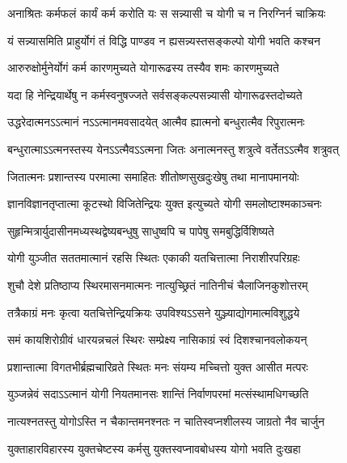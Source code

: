\twolineshloka
{अनाश्रितः कर्मफलं कार्यं कर्म करोति यः}
{स सन्न्यासी च योगी च न निरग्निर्न चाक्रियः}%

\twolineshloka
{यं सन्न्यासमिति प्राहुर्योगं तं विद्धि पाण्डव}
{न ह्यसन्न्यस्तसङ्कल्पो योगी भवति कश्चन}%

\twolineshloka
{आरुरुक्षोर्मुनेर्योगं कर्म कारणमुच्यते}
{योगारूढस्य तस्यैव शमः कारणमुच्यते}%

\twolineshloka
{यदा हि नेन्द्रियार्थेषु न कर्मस्वनुषज्जते}
{सर्वसङ्कल्पसन्न्यासी योगारूढस्तदोच्यते}%

\twolineshloka
{उद्धरेदात्मनऽऽत्मानं नऽऽत्मानमवसादयेत्}
{आत्मैव ह्यात्मनो बन्धुरात्मैव रिपुरात्मनः}%

\twolineshloka
{बन्धुरात्माऽऽत्मनस्तस्य येनऽऽत्मैवऽऽत्मना जितः}
{अनात्मनस्तु शत्रुत्वे वर्तेतऽऽत्मैव शत्रुवत्}%

\twolineshloka
{जितात्मनः प्रशान्तस्य परमात्मा समाहितः}
{शीतोष्णसुखदुःखेषु तथा मानापमानयोः}%

\twolineshloka
{ज्ञानविज्ञानतृप्तात्मा कूटस्थो विजितेन्द्रियः}
{युक्त इत्युच्यते योगी समलोष्टाश्मकाञ्चनः}%

\twolineshloka
{सुहृन्मित्रार्युदासीनमध्यस्थद्वेष्यबन्धुषु}
{साधुष्वपि च पापेषु समबुद्धिर्विशिष्यते}%

\twolineshloka
{योगी युञ्जीत सततमात्मानं रहसि स्थितः}
{एकाकी यतचित्तात्मा निराशीरपरिग्रहः}%

\twolineshloka
{शुचौ देशे प्रतिष्ठाप्य स्थिरमासनमात्मनः}
{नात्युच्छ्रितं नातिनीचं चैलाजिनकुशोत्तरम्}%

\twolineshloka
{तत्रैकाग्रं मनः कृत्वा यतचित्तेन्द्रियक्रियः}
{उपविश्यऽऽसने युञ्ज्याद्योगमात्मविशुद्धये}%

\twolineshloka
{समं कायशिरोग्रीवं धारयन्नचलं स्थिरः}
{सम्प्रेक्ष्य नासिकाग्रं स्वं दिशश्चानवलोकयन्}%

\twolineshloka
{प्रशान्तात्मा विगतभीर्ब्रह्मचारिव्रते स्थितः}
{मनः संयम्य मच्चित्तो युक्त आसीत मत्परः}%

\twolineshloka
{युञ्जन्नेवं सदाऽऽत्मानं योगी नियतमानसः}
{शान्तिं निर्वाणपरमां मत्संस्थामधिगच्छति}%

\twolineshloka
{नात्यश्नतस्तु योगोऽस्ति न चैकान्तमनश्नतः}
{न चातिस्वप्नशीलस्य जाग्रतो नैव चार्जुन}%

\twolineshloka
{युक्ताहारविहारस्य युक्तचेष्टस्य कर्मसु}
{युक्तस्वप्नावबोधस्य योगो भवति दुःखहा}%


